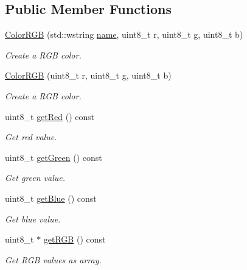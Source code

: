 \subsection*{Public Member Functions}
\begin{DoxyCompactItemize}
\item 
\hyperlink{classmastermind_1_1logic_1_1_color_r_g_b_a06ed69416fc73bb7456f281b32def4ea}{Color\+R\+GB} (std\+::wstring \hyperlink{classmastermind_1_1logic_1_1_color_aa086b665d9a43db3acbd43ed7f4d31ba}{name}, uint8\+\_\+t r, uint8\+\_\+t g, uint8\+\_\+t b)
\begin{DoxyCompactList}\small\item\em Create a R\+GB color. \end{DoxyCompactList}\item 
\hyperlink{classmastermind_1_1logic_1_1_color_r_g_b_aa8391f55de09ffdb14936ba1283e4a5b}{Color\+R\+GB} (uint8\+\_\+t r, uint8\+\_\+t g, uint8\+\_\+t b)
\begin{DoxyCompactList}\small\item\em Create a R\+GB color. \end{DoxyCompactList}\item 
uint8\+\_\+t \hyperlink{classmastermind_1_1logic_1_1_color_r_g_b_ace7e594445a112e54776f0e0a57e5478}{get\+Red} () const
\begin{DoxyCompactList}\small\item\em Get red value. \end{DoxyCompactList}\item 
uint8\+\_\+t \hyperlink{classmastermind_1_1logic_1_1_color_r_g_b_a4b4f9754ce5287b3b8abf61cbc84ad11}{get\+Green} () const
\begin{DoxyCompactList}\small\item\em Get green value. \end{DoxyCompactList}\item 
uint8\+\_\+t \hyperlink{classmastermind_1_1logic_1_1_color_r_g_b_a0838de88ff779b5640d47ad5130f379b}{get\+Blue} () const
\begin{DoxyCompactList}\small\item\em Get blue value. \end{DoxyCompactList}\item 
uint8\+\_\+t $\ast$ \hyperlink{classmastermind_1_1logic_1_1_color_r_g_b_a58bbc8f966399582307612db3da39acb}{get\+R\+GB} () const
\begin{DoxyCompactList}\small\item\em Get R\+GB values as array. \end{DoxyCompactList}\item 

\end{DoxyCompactItemize}
